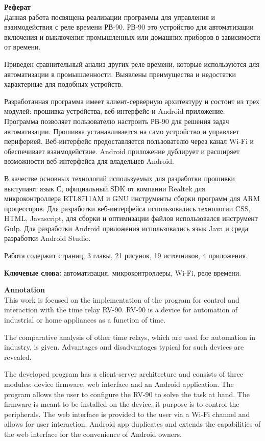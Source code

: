 \textbf{\Large Реферат} \\

Данная работа посвящена реализации программы для управления и взаимодействия с реле времени РВ-90. РВ-90 это устройство для автоматизации включения и выключения промышленных или домашних приборов в зависимости от времени.

Приведен сравнительный анализ других реле времени, которые используются для автоматизации в промышленности. Выявлены преимущества и недостатки характерные для подобных устройств.

Разработанная программа имеет клиент-серверную архитектуру и состоит из трех модулей: прошивка устройства, веб-интерфейс и Android приложение. Программа позволяет пользователю настроить РВ-90 для решения задач автоматизации. Прошивка устанавливается на само устройство и управляет периферией. Веб-интерфейс предоставляется пользователю через канал Wi-Fi и обеспечивает взаимодействие. Android приложение дублирует и расширяет возможности веб-интерфейса для владельцев Android.

В качестве основных технологий используемых для разработки прошивки выступают язык С, официальный SDK от компании Realtek для микроконтроллера RTL8711AM и GNU инструменты сборки программ для ARM процессоров. Для разработки веб-интерфейса использовались технологии CSS, HTML, Javascript, для сборки и оптимизации файлов использовался инструмент Gulp. Для разработки Android приложения использовались язык Java и среда разработки Android Studio.

Работа содержит \pageref{LastPage} страниц, 3 главы, 21 рисунок, 19 источников, 4 приложения.

\textbf{Ключевые слова:} автоматизация,  микроконтроллеры, Wi-Fi, реле времени.

\newpage

\textbf{\Large Annotation} \\

This work is focused on the implementation of the program for control and interaction with the time relay RV-90. RV-90 is a device for automation of industrial or home appliances as a function of time.

The comparative analysis of other time relays, which are used for automation in industry, is given. Advantages and disadvantages typical for such devices are revealed.

The developed program has a client-server architecture and consists of three modules: device firmware, web interface and an Android application. The program allows the user to configure the RV-90 to solve the task at hand. The firmware is meant to be installed on the device, it purpose is to control the peripherals. The web interface is provided to the user via a Wi-Fi channel and allows for user interaction. Android app duplicates and extends the capabilities of the web interface for the convenience of Android owners.

